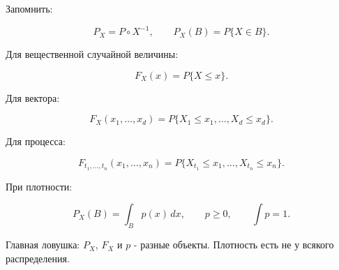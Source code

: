 \documentclass[
  11pt,
  a4paper,
]{article}
\begin{document}
Запомнить:

\[
P_X=P\circ X^{-1},
\qquad
P_X(B)=P\{X\in B\}.
\]

Для вещественной случайной величины:

\[
F_X(x)=P\{X\le x\}.
\]

Для вектора:

\[
F_X(x_1,\ldots,x_d)
=
P\{X_1\le x_1,\ldots,X_d\le x_d\}.
\]

Для процесса:

\[
F_{t_1,\ldots,t_n}(x_1,\ldots,x_n)
=
P\{X_{t_1}\le x_1,\ldots,X_{t_n}\le x_n\}.
\]

При плотности:

\[
P_X(B)=\int_Bp(x)\,dx,\qquad
p\ge0,\qquad
\int p=1.
\]

Главная ловушка: \(P_X\), \(F_X\) и \(p\) - разные объекты. Плотность
есть не у всякого распределения.

\newpage
\end{document}
